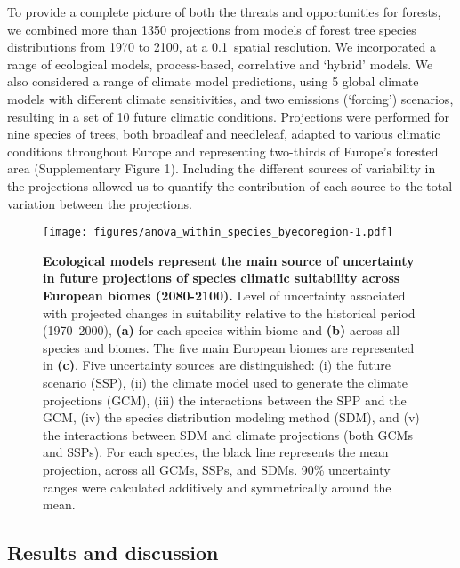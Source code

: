 \documentclass[11pt,letter]{article}
\begin{document}
To provide a complete picture of both the threats and opportunities for forests, we combined more than 1350 projections from models of forest tree species distributions from 1970 to 2100, at a 0.1\degree~spatial resolution. We incorporated a range of ecological models,  process-based, correlative and `hybrid' models. We also considered a range of climate model predictions, using 5 global climate models with different climate sensitivities, and two emissions (`forcing') scenarios, resulting in a set of 10 future climatic conditions. Projections were performed for nine species of trees, both broadleaf and needleleaf, adapted to various climatic conditions throughout Europe and representing two-thirds of Europe's forested area (Supplementary Figure 1). Including the different sources of variability in the projections allowed us to quantify the contribution of each source to the total variation between the projections. 

\begin{figure}
	\centering
	\texttt{[image: figures/anova\_within\_species\_byecoregion-1.pdf]}
	\caption{\textbf{Ecological models represent the main source of uncertainty in future projections of species climatic suitability across European biomes (2080-2100).} Level of uncertainty associated with projected changes in suitability relative to the historical period (1970–2000), \textbf{(a)} for each species within biome and \textbf{(b)} across all species and biomes. The five main European biomes are represented in \textbf{(c)}. Five uncertainty sources are distinguished: (i) the future scenario (SSP), (ii) the climate model used to generate the climate projections (GCM), (iii) the interactions between the SPP and the GCM, (iv) the species distribution modeling method (SDM), and (v) the interactions between SDM and climate projections (both GCMs and SSPs). For each species, the black line represents the mean projection, across all GCMs, SSPs, and SDMs. 90\% uncertainty ranges were calculated additively and symmetrically around the mean.}
	\label{fig:anovaspecies}  %
\end{figure}

\subsection*{Results and discussion}
\end{document}
